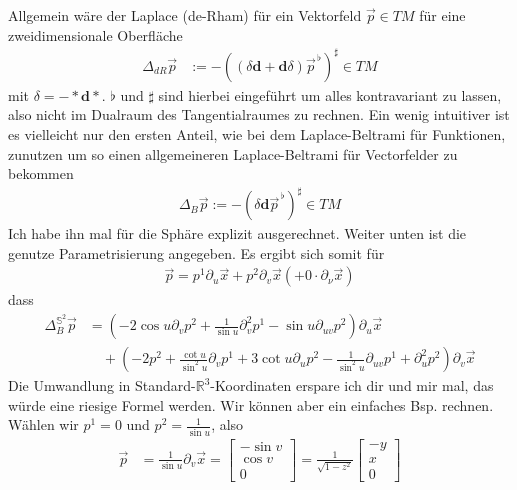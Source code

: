 \documentclass{scrartcl}
\newcommand{\R}{\mathds{R}}
\newcommand{\exd}{\mathbf{d}}
\newcommand{\vecflat}[1]{\vec{#1}^{\,\flat}}
\begin{document}
  Allgemein wäre der Laplace (de-Rham) für ein Vektorfeld \( \vec{p}\in TM \) für eine zweidimensionale Oberfläche
  \begin{align}
    \Delta_{dR} \vec{p} &:= -\left( \left( \delta\exd + \exd\delta \right)\vecflat{p}\right)^{\sharp} \in TM
  \end{align}
  mit \( \delta = - * \exd * \).
  \( \flat \) und \( \sharp \) sind hierbei eingeführt um alles kontravariant zu lassen, also nicht im Dualraum des Tangentialraumes zu rechnen.
  Ein wenig intuitiver ist es vielleicht nur den ersten Anteil, wie bei dem Laplace-Beltrami für Funktionen, zunutzen um so einen allgemeineren Laplace-Beltrami für Vectorfelder zu bekommen
  \begin{align}
    \Delta_{B} \vec{p}:= -\left( \delta\exd \vecflat{p}\right)^{\sharp} \in TM
  \end{align}
  Ich habe ihn mal für die Sphäre explizit ausgerechnet.
  Weiter unten ist die genutze Parametrisierung angegeben.
  Es ergibt sich somit für
  \begin{align}
    \vec{p} = p^{1}\partial_{u}\vec{x} + p^{2}\partial_{v}\vec{x} \left( + 0 \cdot \partial_{\nu}\vec{x} \right)
  \end{align}
  dass
  \begin{align}
    \Delta^{ \mathds{S}^{2}}_{B}\vec{p} &= \left( -2\cos u \partial_{v} p^{2} + \frac{1}{\sin u} \partial_{v}^{2} p^{1} - \sin u \partial_{uv} p^{2}\right) \partial_{u}\vec{x} \\
                   &\quad + \left( -2p^{2} + \frac{\cot u}{\sin^{2}u} \partial_{v}p^{1} + 3\cot u \partial_{u}p^{2}  
                              -\frac{1}{\sin^{2}u}\partial_{uv}p^{1} + \partial_{u}^{2} p^{2}\right) \partial_{v}\vec{x}
  \end{align}
  Die Umwandlung in Standard-\( \R^{3} \)-Koordinaten erspare ich dir und mir mal, das würde eine riesige Formel werden.
  Wir können aber ein einfaches Bsp. rechnen.
  Wählen wir \( p^{1} = 0 \) und \( p^{2} = \frac{1}{\sin u} \), also
  \begin{align}
    \vec{p} &= \frac{1}{\sin u} \partial_{v}\vec{x} 
          =\begin{bmatrix}
            -\sin v \\ \cos v \\ 0
           \end{bmatrix}
          = \frac{1}{\sqrt{1-z^{2}}}
            \begin{bmatrix}
            -y \\ x \\ 0
           \end{bmatrix}
  \end{align}
\end{document}
